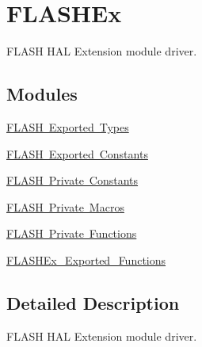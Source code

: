 \hypertarget{group___f_l_a_s_h_ex}{}\section{F\+L\+A\+S\+H\+Ex}
\label{group___f_l_a_s_h_ex}


F\+L\+A\+SH H\+AL Extension module driver.  


\subsection*{Modules}
\begin{DoxyCompactItemize}
\item 
\mbox{\hyperlink{group___f_l_a_s_h_ex___exported___types}{F\+L\+A\+S\+H Exported Types}}
\item 
\mbox{\hyperlink{group___f_l_a_s_h_ex___exported___constants}{F\+L\+A\+S\+H Exported Constants}}
\item 
\mbox{\hyperlink{group___f_l_a_s_h_ex___private___constants}{F\+L\+A\+S\+H Private Constants}}
\item 
\mbox{\hyperlink{group___f_l_a_s_h_ex___private___macros}{F\+L\+A\+S\+H Private Macros}}
\item 
\mbox{\hyperlink{group___f_l_a_s_h_ex___private___functions}{F\+L\+A\+S\+H Private Functions}}
\item 
\mbox{\hyperlink{group___f_l_a_s_h_ex___exported___functions}{F\+L\+A\+S\+H\+Ex\+\_\+\+Exported\+\_\+\+Functions}}
\end{DoxyCompactItemize}


\subsection{Detailed Description}
F\+L\+A\+SH H\+AL Extension module driver. 

